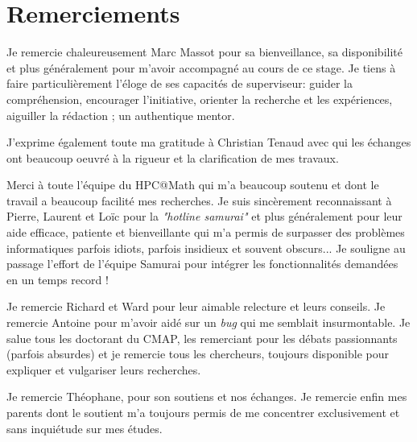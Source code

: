 \documentclass[11pt]{report}
\theoremstyle{definition}
\theoremstyle{remark}
\begin{document}
\newpage
\thispagestyle{empty}
\mbox{}

\newpage
\section*{Remerciements}
    Je remercie chaleureusement Marc Massot pour sa bienveillance, sa disponibilité et plus généralement pour m'avoir accompagné au cours de ce stage. 
    Je tiens à faire particulièrement l'éloge de ses capacités de superviseur: guider la compréhension, encourager l'initiative,
    orienter la recherche et les expériences, aiguiller la rédaction ; un authentique mentor.\par


    J'exprime également toute ma gratitude à Christian Tenaud avec qui les échanges ont beaucoup oeuvré à la rigueur et la clarification de mes travaux.\par


    Merci à toute l'équipe du HPC@Math qui m'a beaucoup soutenu et dont le travail a beaucoup facilité mes recherches.
    Je suis sincèrement reconnaissant à Pierre, Laurent et Loïc pour la \textit{"hotline samurai"} et plus généralement pour leur aide efficace, patiente et bienveillante qui m'a permis de surpasser des problèmes informatiques
    parfois idiots, parfois insidieux et souvent obscurs...
    Je souligne au passage l'effort de l'équipe Samurai pour intégrer les fonctionnalités demandées en un temps record !\par


    Je remercie Richard et Ward pour leur aimable relecture et leurs conseils.
    Je remercie Antoine pour m'avoir aidé sur un \textit{bug} qui me semblait insurmontable.
    Je salue tous les doctorant du CMAP, les remerciant pour les débats passionnants (parfois absurdes) et je remercie tous les chercheurs, toujours disponible pour expliquer et vulgariser leurs recherches.\par 


    Je remercie Théophane, pour son soutiens et nos échanges.
    Je remercie enfin mes parents dont le soutient m'a toujours permis de me concentrer exclusivement et sans inquiétude sur mes études.
\newpage

\newpage
\tableofcontents

\newpage

\listoffigures
{}
\end{document}

